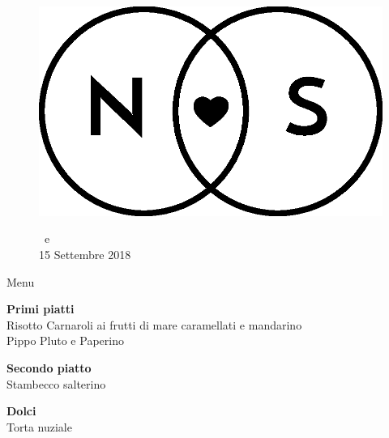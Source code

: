 \documentclass[11pt]{book}
\begin{document}
\begin{center}

\begin{figure}

\centering
\includegraphics[scale=0.3]{img/Logo_piccolo.eps}

\NSposo \ e \NSposa\\
15 Settembre 2018\\
\end{figure}

\Huge Menu\\
\hfill\break

\normalsize
\textbf{Primi piatti}\\
Risotto Carnaroli ai frutti di mare caramellati e mandarino\\
\hfill\break
Pippo Pluto e Paperino
\hfill\break

\textbf{Secondo piatto}\\
Stambecco salterino
\hfill\break

\textbf{Dolci}\\
Torta nuziale
\vfill
\end{center}
\end{document}
